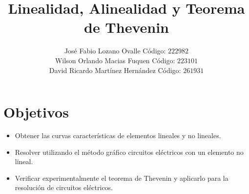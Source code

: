 \documentclass[twocolumn]{IEEEtran}
\begin{document}
\title{Linealidad, Alinealidad y Teorema de Thevenin}
\author{José Fabio Lozano Ovalle Código: $222982$\\
	Wilson Orlando Macias Fuquen Código: $223101$\\
	David Ricardo Martínez Hernández Código: $261931$}
\maketitle
{}

\section{Objetivos}
\noindent
\begin{itemize}
 \item Obtener las curvas características de elementos lineales y no lineales.
 \item Resolver utilizando el método gráfico circuitos eléctricos con un elemento no lineal.
 \item Verificar experimentalmente  el teorema de Thevenin y aplicarlo para la resolución de circuitos eléctricos.
\end{itemize}
\end{document}
